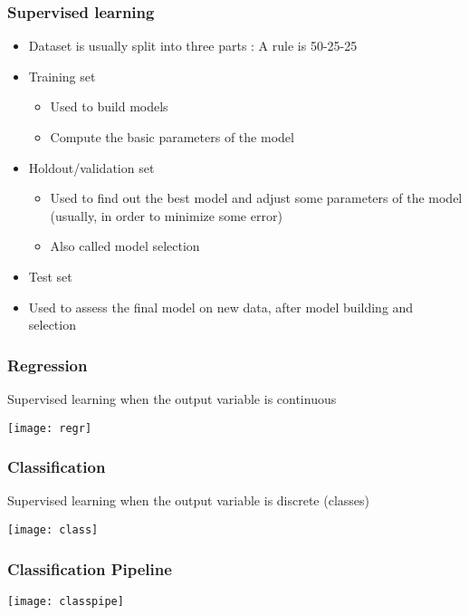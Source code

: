 \begin{frame}[fragile]\frametitle{Supervised learning}
  \begin{itemize}
    \item Dataset is usually split into three parts : A rule is 50-25-25
    \item Training set
      \begin{itemize}
    \item Used to build models
    \item Compute the basic parameters of the model
      \end{itemize}
    \item Holdout/validation set
      \begin{itemize}
    \item Used to find out the best model and adjust some parameters of the model (usually, in order to minimize some error)
    \item Also called model selection
      \end{itemize}
    \item Test set
    \item Used to assess the final model on new data, after model building and selection
  \end{itemize}
\end{frame}

\begin{frame}[fragile]\frametitle{Regression}
Supervised learning when the output variable is continuous 
\begin{center}
\texttt{[image: regr]}
\end{center}
\end{frame}

\begin{frame}[fragile]\frametitle{Classification}
Supervised learning when the output variable is discrete (classes)
\begin{center}
\texttt{[image: class]}
\end{center}
\end{frame}

\begin{frame}[fragile]\frametitle{Classification Pipeline}
\begin{center}
\texttt{[image: classpipe]}
\end{center}
\end{frame}



